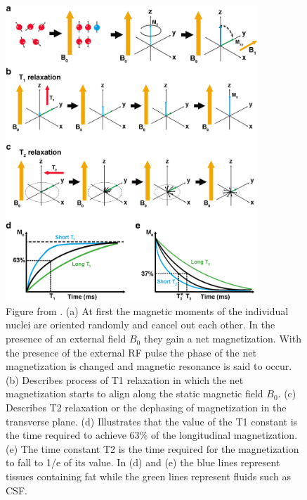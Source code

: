 \documentclass[msthesis.tex]{subfiles}
\begin{document}
\begin{figure}
\centering
\includegraphics[width=0.847\textwidth]{images/mri1.png}
\caption{Figure from \cite{Mastrogiacomo2019}. (a) At first the magnetic moments of the individual nuclei are oriented randomly and cancel out each other. In the presence of an external field $B_0$ they gain a net magnetization. With the presence of the external RF pulse the phase of the net magnetization is changed and magnetic resonance is said to occur. (b) Describes process of T1 relaxation in which the net magnetization starts to align along the static magnetic field $B_0$. (c) Describes T2 relaxation or the dephasing of magnetization in the transverse plane. (d) Illustrates that the value of the T1 constant is the time required to achieve 63\% of the longitudinal magnetization. (e) The time constant T2 is the time required for the magnetization to fall to 1/e of its value. In (d) and (e) the blue lines represent tissues containing fat while the green lines represent fluids such as \gls{CSF}.}
\label{mriphysics}
\end{figure}
\end{document}
